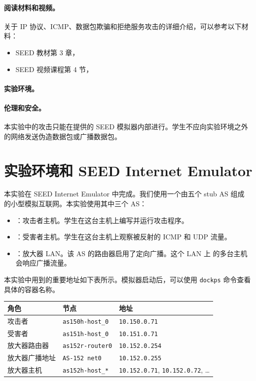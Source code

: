 \paragraph{阅读材料和视频。}
关于 IP 协议、ICMP、数据包欺骗和拒绝服务攻击的详细介绍，可以参考以下材料：

\begin{itemize}
\item SEED 教材第 3 章，\seedisbook
\item SEED 视频课程第 4 节，\seedisvideo
\end{itemize}


\paragraph{实验环境。}
\seedenvironmentB
\nodependency


\paragraph{伦理和安全。}
本实验中的攻击只能在提供的 SEED 模拟器内部进行。学生不应向实验环境之外
的网络发送伪造数据包或广播数据包。


\section{实验环境和 SEED Internet Emulator}

本实验在 SEED Internet Emulator 中完成。我们使用一个由五个 stub AS 组成
的小型模拟互联网。本实验使用其中三个 AS：

\begin{itemize}[noitemsep]
\item \attacker：攻击者主机。学生在这台主机上编写并运行攻击程序。
\item \victim：受害者主机。学生在这台主机上观察被反射的 ICMP 和 UDP 流量。
\item \amplifier：放大器 LAN。该 AS 的路由器启用了定向广播。这个 LAN 上
      的多台主机会响应广播流量。
\end{itemize}

本实验中用到的重要地址如下表所示。模拟器启动后，可以使用 \texttt{dockps}
命令查看具体的容器名称。

\begin{center}
\begin{tabular}{|l|l|l|}
\hline
\textbf{角色} & \textbf{节点} & \textbf{地址} \\
\hline
攻击者 & \texttt{as150h-host\_0} & \texttt{10.150.0.71} \\
受害者 & \texttt{as151h-host\_0} & \texttt{10.151.0.71} \\
放大器路由器 & \texttt{as152r-router0} & \texttt{10.152.0.254} \\
放大器广播地址 & \texttt{AS-152 net0} & \texttt{10.152.0.255} \\
放大器主机 & \texttt{as152h-host\_*} & \texttt{10.152.0.71}, \texttt{10.152.0.72}, \ldots \\
\hline
\end{tabular}
\end{center}


